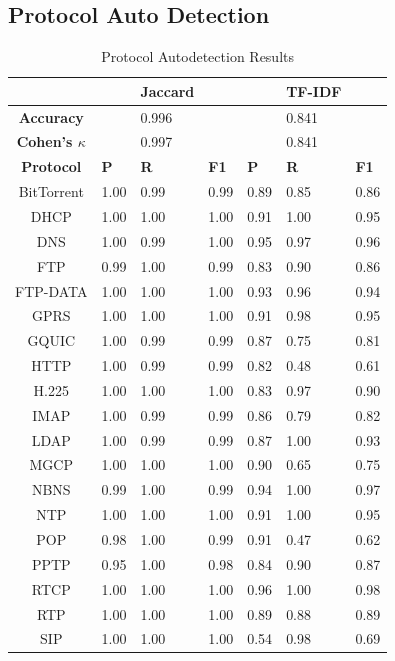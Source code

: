 \subsection{Protocol Auto Detection}

\begin{table}
\caption{Protocol Autodetection Results}
\centering
\begin{tabular}{| c | p{0.6cm}  p{0.6cm}  p{0.6cm} || p{0.6cm}  p{0.6cm}  p{0.6cm} |}
\hline
& & \textbf{Jaccard} & & & \textbf{TF-IDF} & \\
\hline
\hline
\textbf{Accuracy} & & 0.996 & & & 0.841 & \\
\textbf{Cohen's $\kappa$} & & 0.997 & & & 0.841 & \\
\hline
\hline
 \textbf{Protocol} & \textbf{P} & \textbf{R} & \textbf{F1} & \textbf{P} & \textbf{R} & \textbf{F1} \\
 \hline
 BitTorrent & 1.00 & 0.99 & 0.99 & 0.89 & 0.85 & 0.86 \\
 DHCP & 1.00 & 1.00 & 1.00 & 0.91 & 1.00 & 0.95 \\
 DNS & 1.00 & 0.99 & 1.00 & 0.95 & 0.97 & 0.96 \\
 FTP & 0.99 & 1.00 & 0.99 & 0.83 & 0.90 & 0.86 \\
 FTP-DATA & 1.00 & 1.00 & 1.00 & 0.93 & 0.96 & 0.94 \\
 GPRS & 1.00 & 1.00 & 1.00 & 0.91 & 0.98 & 0.95 \\
 GQUIC & 1.00 & 0.99 & 0.99 & 0.87 & 0.75 & 0.81 \\
 HTTP & 1.00 & 0.99 & 0.99 & 0.82 & 0.48 & 0.61 \\
 H.225 & 1.00 & 1.00 & 1.00 & 0.83 & 0.97 & 0.90 \\
 IMAP & 1.00 & 0.99 & 0.99 & 0.86 & 0.79 & 0.82\\
 LDAP & 1.00 & 0.99 & 0.99 & 0.87 & 1.00 & 0.93 \\
 MGCP & 1.00 & 1.00 & 1.00 & 0.90 & 0.65 & 0.75 \\
 NBNS & 0.99 & 1.00 & 0.99 & 0.94 & 1.00 & 0.97 \\
 NTP & 1.00 & 1.00 & 1.00 & 0.91 & 1.00 & 0.95 \\
 POP & 0.98 & 1.00 & 0.99 & 0.91 & 0.47 & 0.62 \\
 PPTP & 0.95 & 1.00 & 0.98 & 0.84 & 0.90 & 0.87 \\
 RTCP & 1.00 & 1.00 & 1.00 & 0.96 & 1.00 & 0.98 \\
 RTP & 1.00 & 1.00 & 1.00 & 0.89 & 0.88 & 0.89\\
 SIP & 1.00 & 1.00 & 1.00 & 0.54 & 0.98 & 0.69 \\

\end{tabular}
\end{table}
